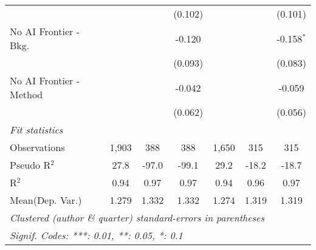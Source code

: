 \begin{tabular}{lcccccc}
                           &         &              & (0.102) &         &         & (0.101)\\   
   No AI Frontier - Bkg.   &         &              & -0.120  &         &         & -0.158$^{*}$\\   
                           &         &              & (0.093) &         &         & (0.083)\\   
   No AI Frontier - Method &         &              & -0.042  &         &         & -0.059\\   
                           &         &              & (0.062) &         &         & (0.056)\\   
   \midrule
   \emph{Fit statistics}\\
   Observations            & 1,903   & 388          & 388     & 1,650   & 315     & 315\\  
   Pseudo R$^2$            & 27.8    & -97.0        & -99.1   & 29.2    & -18.2   & -18.7\\  
   R$^2$                   & 0.94    & 0.97         & 0.97    & 0.94    & 0.96    & 0.97\\  
Mean(Dep. Var.) & 1.279 & 1.332 & 1.332 & 1.274 & 1.319 & 1.319 \\
   \midrule \midrule
   \multicolumn{7}{l}{\emph{Clustered (author \& quarter) standard-errors in parentheses}}\\
   \multicolumn{7}{l}{\emph{Signif. Codes: ***: 0.01, **: 0.05, *: 0.1}}\\
\end{tabular}
\par\endgroup
